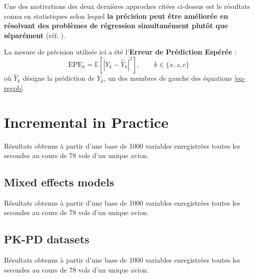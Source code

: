 \documentclass[a0,portrait]{a0poster}
\newcommand{\E}[1]{\mathbb{E}[#1]}
\begin{document}
\begin{multicols}{2}
Une des motivations des deux dernières approches citées ci-dessus est le résultats connu en statistiques selon lequel \textbf{la précision peut être améliorée en résolvant des problèmes de régression simultanément plutôt que séparément} (réf. \cite{stein61}).

La mesure de précision utilisée ici a été l'\textbf{Erreur de Prédiction Espérée} :
\begin{equation}
\mbox{EPE}_k = \E{|Y_k - \hat{Y}_k|^2}, \qquad k\in \{x,z,c\}
\end{equation}
où $\hat{Y}_k$ désigne la prédiction de $Y_k$, un des membres de gauche des équations \eqref{eq-regpb}.

\section{Incremental in Practice}

Résultats obtenus à partir d'une base de 1000 variables enregistrées toutes les secondes au cours de 78 vols d'un unique avion.

\subsection{Mixed effects models}
Résultats obtenus à partir d'une base de 1000 variables enregistrées toutes les secondes au cours de 78 vols d'un unique avion.

\subsection{PK-PD datasets}
Résultats obtenus à partir d'une base de 1000 variables enregistrées toutes les secondes au cours de 78 vols d'un unique avion.




\end{multicols}
\end{document}
